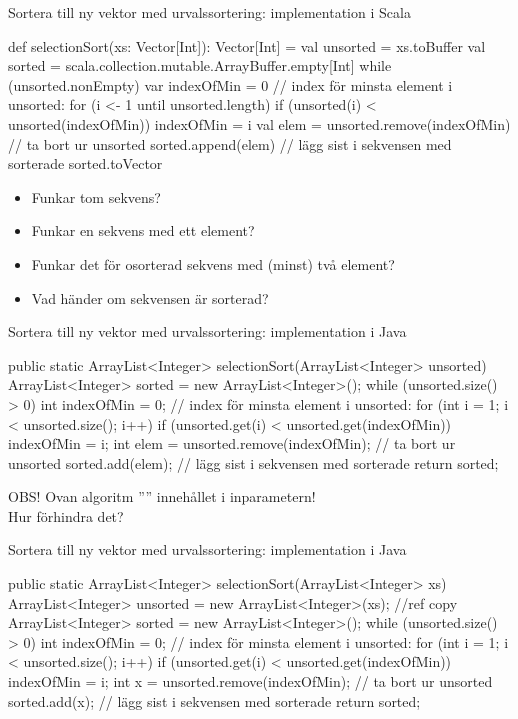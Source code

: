 \begin{Slide}{Sortera till ny vektor med urvalssortering: implementation i Scala}
\SlideFontTiny\vspace{-0.5em}
\begin{Code}
def selectionSort(xs: Vector[Int]): Vector[Int] = {
  val unsorted = xs.toBuffer
  val sorted = scala.collection.mutable.ArrayBuffer.empty[Int] 
  while (unsorted.nonEmpty) {
    var indexOfMin = 0
    // index för minsta element i unsorted:
    for (i <- 1 until unsorted.length) {
      if (unsorted(i) < unsorted(indexOfMin)) indexOfMin = i
    } 
    val elem = unsorted.remove(indexOfMin)  // ta bort ur unsorted
    sorted.append(elem)  // lägg sist i sekvensen med sorterade
  }
  sorted.toVector
}
\end{Code}
\pause
\begin{itemize}
\item Funkar tom sekvens?
\item Funkar en sekvens med ett element?
\item Funkar det för osorterad sekvens med (minst) två element?
\item Vad händer om sekvensen är sorterad?
\end{itemize}
\end{Slide}

\begin{Slide}{Sortera till ny vektor med urvalssortering: implementation i Java}
\begin{Code}[language=Java]
public static ArrayList<Integer> selectionSort(ArrayList<Integer> unsorted) {
    ArrayList<Integer> sorted = new ArrayList<Integer>();
    while (unsorted.size() > 0) {
        int indexOfMin = 0;
        // index för minsta element i unsorted:
        for (int i = 1; i < unsorted.size(); i++) { 
            if (unsorted.get(i) < unsorted.get(indexOfMin)) {
                indexOfMin = i;
            }
        }
        int elem = unsorted.remove(indexOfMin);  // ta bort ur unsorted
        sorted.add(elem);  // lägg sist i sekvensen med sorterade
    }
    return sorted;
}
\end{Code}
OBS! Ovan algoritm '''' innehållet i inparametern! \\ Hur förhindra det?
\end{Slide}

\begin{Slide}{Sortera till ny vektor med urvalssortering: implementation i Java}
\begin{Code}[language=Java]
public static ArrayList<Integer> selectionSort(ArrayList<Integer> xs) {
    ArrayList<Integer> unsorted = new ArrayList<Integer>(xs); //ref copy
    ArrayList<Integer> sorted = new ArrayList<Integer>();
    while (unsorted.size() > 0) {
        int indexOfMin = 0;
        // index för minsta element i unsorted:
        for (int i = 1; i < unsorted.size(); i++) { 
            if (unsorted.get(i) < unsorted.get(indexOfMin)) {
                indexOfMin = i;
            }
        }
        int x = unsorted.remove(indexOfMin);  // ta bort ur unsorted
        sorted.add(x);  // lägg sist i sekvensen med sorterade
    }
    return sorted;
}
\end{Code}
\end{Slide}

